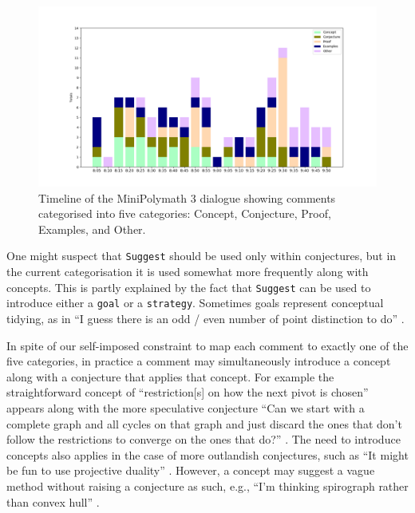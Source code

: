 \documentclass[smallextended,oneside]{svjour3}       %
\let\cite\citep
\newcommand\nothing[1]{#1}
\let\paragraph\nothing
\begin{document}
\begin{figure}[h]
\begin{center}
\includegraphics[trim=3cm 1.2cm 3cm 1.2cm,clip=true,width=\textwidth]{alternative}
\end{center}
\caption{Timeline of the MiniPolymath 3 dialogue showing comments categorised into five categories: Concept, Conjecture, Proof, Examples, and Other.
\label{fig:alternative}}
\end{figure}

\paragraph{One might suspect that \texttt{Suggest} should be used only within conjectures, but in the current categorisation it is used somewhat more frequently along with concepts.}
This is partly explained by the fact that \texttt{Suggest} can be used
to introduce either a \texttt{goal} or a \texttt{strategy}.  Sometimes goals
represent conceptual tidying, as in ``I guess there is an odd / even
number of point distinction to do'' \cite[\href{https://wp.me/pAG2F-41\#comment-3398}{July 19, 9:31 pm}]{tao2011imo}.

\paragraph{In spite of our self-imposed constraint to map each comment to exactly one of the five categories, in practice a comment may simultaneously introduce a concept along with a conjecture that applies that concept.}
For example the straightforward concept of
``restriction[s] on how the next pivot is chosen''
appears along with the more speculative conjecture  ``Can we
start with a complete graph and all cycles on that graph and just
discard the ones that don't follow the restrictions to converge on the
ones that do?''
\cite[\href{https://wp.me/pAG2F-41\#comment-3368}{July 19, 8:56 pm}]{tao2011imo}.
The need to introduce concepts also applies in the case of more outlandish conjectures,
such as
``It might be fun to use projective duality''
\cite[\href{https://wp.me/pAG2F-41\#comment-3324}{July 19, 8:23 pm}]{tao2011imo}.
However, a concept may suggest a vague method
without raising a conjecture as such,
e.g., ``I'm thinking spirograph rather than convex hull''
\cite[\href{https://wp.me/pAG2F-41\#comment-3349}{July 19, 8:44 pm}]{tao2011imo}.
\end{document}
